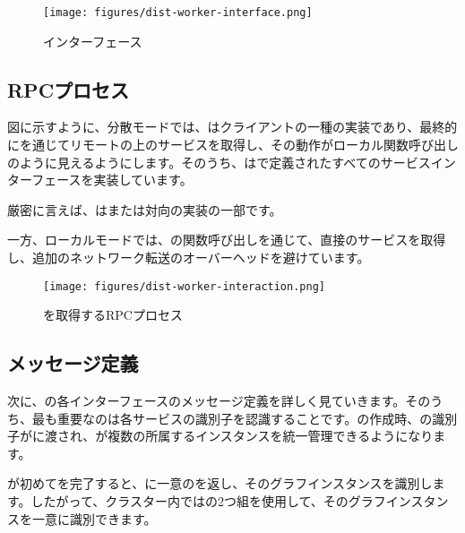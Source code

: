 \begin{content}
\begin{figure}[H]
\centering
\texttt{[image: figures/dist-worker-interface.png]}
\caption{インターフェース}
 \label{fig:dist-worker-interface}
\end{figure}

\subsection{RPCプロセス}

図に示すように、分散モードでは、はクライアントの一種の実装であり、最終的にを通じてリモートの上のサービスを取得し、その動作がローカル関数呼び出しのように見えるようにします。そのうち、はで定義されたすべてのサービスインターフェースを実装しています。

\begin{remark}
厳密に言えば、はまたは対向の実装の一部です。
\end{remark}

一方、ローカルモードでは、の関数呼び出しを通じて、直接のサービスを取得し、追加のネットワーク転送のオーバーヘッドを避けています。

\begin{figure}[H]
\centering
\texttt{[image: figures/dist-worker-interaction.png]}
\caption{を取得するRPCプロセス}
 \label{fig:dist-worker-interaction}
\end{figure}

\subsection{メッセージ定義}

次に、の各インターフェースのメッセージ定義を詳しく見ていきます。そのうち、最も重要なのは各サービスの識別子を認識することです。の作成時、の識別子がに渡され、が複数の所属するインスタンスを統一管理できるようになります。

が初めてを完了すると、に一意のを返し、そのグラフインスタンスを識別します。したがって、クラスター内ではの2つ組を使用して、そのグラフインスタンスを一意に識別できます。


\end{content}
